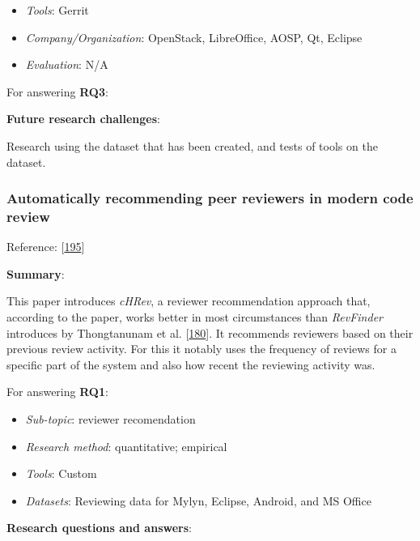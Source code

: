 \documentclass[]{book}
\providecommand{\tightlist}{%
  \setlength{\itemsep}{0pt}\setlength{\parskip}{0pt}}
\begin{document}
\begin{itemize}
\tightlist
\item
  \emph{Tools}: Gerrit
\item
  \emph{Company/Organization}: OpenStack, LibreOffice, AOSP, Qt, Eclipse
\item
  \emph{Evaluation}: N/A
\end{itemize}

For answering \textbf{RQ3}:

\textbf{Future research challenges}:

Research using the dataset that has been created, and tests of tools on
the dataset.

\subsubsection{Automatically recommending peer reviewers in modern code
review}\label{automatically-recommending-peer-reviewers-in-modern-code-review}

Reference: {[}\protect\hyperlink{ref-zanjani2016automatically}{195}{]}

\textbf{Summary}:

This paper introduces \emph{cHRev}, a reviewer recommendation approach
that, according to the paper, works better in most circumstances than
\emph{RevFinder} introduces by Thongtanunam et al.
{[}\protect\hyperlink{ref-thongtanunam2015should}{180}{]}. It recommends
reviewers based on their previous review activity. For this it notably
uses the frequency of reviews for a specific part of the system and also
how recent the reviewing activity was.

For answering \textbf{RQ1}:

\begin{itemize}
\tightlist
\item
  \emph{Sub-topic}: reviewer recomendation
\item
  \emph{Research method}: quantitative; empirical
\item
  \emph{Tools}: Custom
\item
  \emph{Datasets}: Reviewing data for Mylyn, Eclipse, Android, and MS
  Office
\end{itemize}

\textbf{Research questions and answers}:
\end{document}
